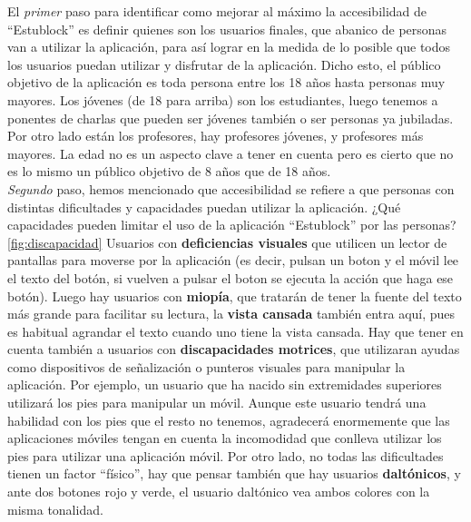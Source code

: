 El \emph{primer} paso para identificar como mejorar al máximo la accesibilidad de ``Estublock'' es definir quienes son los usuarios finales, que abanico de personas van a utilizar la aplicación, para así lograr en la medida de lo posible que todos los usuarios puedan utilizar y disfrutar de la aplicación. Dicho esto, el público objetivo de la aplicación es toda persona entre los 18 años hasta personas muy mayores. Los jóvenes (de 18 para arriba) son los estudiantes, luego tenemos a ponentes de charlas que pueden ser jóvenes también o ser personas ya jubiladas. Por otro lado están los profesores, hay profesores jóvenes, y profesores más mayores. La edad no es un aspecto clave a tener en cuenta pero es cierto que no es lo mismo un público objetivo de 8 años que de 18 años. \\

\emph{Segundo} paso, hemos mencionado que accesibilidad se refiere a que personas con distintas dificultades y capacidades puedan utilizar la aplicación. ¿Qué capacidades pueden limitar el uso de la aplicación ``Estublock'' por las personas?\ref{fig:discapacidad} Usuarios con \textbf{deficiencias visuales} que utilicen un lector de pantallas para moverse por la aplicación (es decir, pulsan un boton y el móvil lee el texto del botón, si vuelven a pulsar el boton se ejecuta la acción que haga ese botón). Luego hay usuarios con \textbf{miopía}, que tratarán de tener la fuente del texto más grande para facilitar su lectura, la \textbf{vista cansada} también entra aquí, pues es habitual agrandar el texto cuando uno tiene la vista cansada. Hay que tener en cuenta también a usuarios con \textbf{discapacidades motrices}, que utilizaran ayudas como dispositivos de señalización o punteros visuales para manipular la aplicación. Por ejemplo, un usuario que ha nacido sin extremidades superiores utilizará los pies para manipular un móvil. Aunque este usuario tendrá una habilidad con los pies que el resto no tenemos, agradecerá enormemente que las aplicaciones móviles tengan en cuenta la incomodidad que conlleva utilizar los pies para utilizar una aplicación móvil. Por otro lado, no todas las dificultades tienen un factor ``físico'', hay que pensar también que hay usuarios \textbf{daltónicos}, y ante dos botones rojo y verde, el usuario daltónico vea ambos colores con la misma tonalidad. \\

